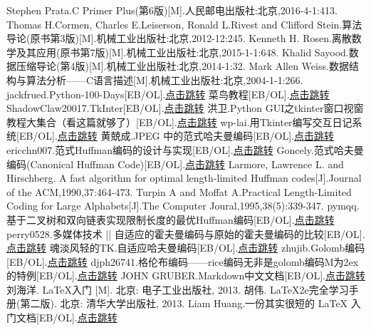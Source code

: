 \documentclass[a4paper]{ctexart}
\begin{document}
\begin{thebibliography}{99}
 Stephen Prata.C Primer Plus(第6版)[M].人民邮电出版社:北京,2016-4-1:413.
 Thomas H.Cormen, Charles E.Leiserson, Ronald L.Rivest and Clifford Stein.算法导论(原书第3版)[M].机械工业出版社:北京,2012-12:245.
 Kenneth H. Rosen.离散数学及其应用(原书第7版)[M].机械工业出版社:北京,2015-1-1:648.
 Khalid Sayood.数据压缩导论(第4版)[M].机械工业出版社:北京,2014-1:32.
 Mark Allen Weiss.数据结构与算法分析——C语言描述[M].机械工业出版社:北京,2004-1-1:266.
 jackfrued.Python-100-Days[EB/OL].\href{https://github.com/jackfrued/Python-100-Days}{点击跳转}
 菜鸟教程[EB/OL].\href{https://www.runoob.com/python3/python3-tutorial.html,unknown.}{点击跳转}
 ShadowClaw20017.TkInter[EB/OL].\href{https://wiki.python.org/moin/TkInter}{点击跳转}
 洪卫.Python GUI之tkinter窗口视窗教程大集合（看这篇就够了）[EB/OL].\href{https://sunhwee.com/posts/80fa3a85.html}{点击跳转}
 wp-lai.用Tkinter编写交互日记系统[EB/OL].\href{https://wp-lai.gitbooks.io/learn-python/content/1sTry/tkinter.html}{点击跳转}
 黄兢成.JPEG 中的范式哈夫曼编码[EB/OL].\href{https://zhuanlan.zhihu.com/p/72044095}{点击跳转}
 ericchn007.范式Huffman编码的设计与实现[EB/OL].\href{https://blog.csdn.net/ericchn007/article/details/2187022}{点击跳转}
 Goncely.范式哈夫曼编码(Canonical Huffman Code)[EB/OL].\href{https://www.cnblogs.com/goncely/archive/2006/03/06/2852153.html}{点击跳转}
 Larmore, Lawrence L. and Hirschberg. A fast algorithm for optimal length-limited Huffman codes[J].Journal of the ACM,1990,37:464-473.
 Turpin A and Moffat A.Practical Length-Limited Coding for Large Alphabets[J].The Computer Joural,1995,38(5):339-347.
 pymqq.基于二叉树和双向链表实现限制长度的最优Huffman编码[EB/OL].\href{https://blog.csdn.net/pymqq/article/details/32084763}{点击跳转}
 perry0528.多媒体技术 || 自适应的霍夫曼编码与原始的霍夫曼编码的比较[EB/OL].\href{https://blog.csdn.net/perry0528/article/details/84931004}{点击跳转}
 魂淡风轻的TK.自适应哈夫曼编码[EB/OL].\href{https://blog.csdn.net/qq_36533706/article/details/80381457}{点击跳转}
 zhujib.Golomb编码[EB/OL].\href{https://blog.csdn.net/u012434983/article/details/12709639}{点击跳转}
 djph26741.格伦布编码——rice编码无非是golomb编码M为2ex的特例[EB/OL].\href{https://blog.csdn.net/djph26741/article/details/101522093}{点击跳转}
 JOHN GRUBER.Markdown中文文档[EB/OL].\href{https://markdown-zh.readthedocs.io/en/latest/}{点击跳转}
 刘海洋. \LaTeX 入门 [M]. 北京: 电子工业出版社, 2013.
 胡伟. \LaTeX 2e完全学习手册(第二版). 北京: 清华大学出版社, 2013.
 Liam Huang.一份其实很短的 LaTeX 入门文档[EB/OL].\href{https://liam.page/2014/09/08/latex-introduction/#TeX_}{点击跳转}
\end{thebibliography}
\end{document}
